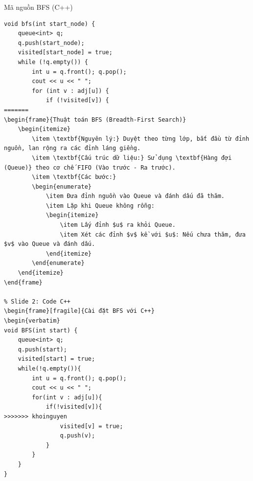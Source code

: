 \begin{frame}[fragile]{Mã nguồn BFS (C++)}
\begin{verbatim}
void bfs(int start_node) {
    queue<int> q;
    q.push(start_node);
    visited[start_node] = true;
    while (!q.empty()) {
        int u = q.front(); q.pop();
        cout << u << " ";
        for (int v : adj[u]) {
            if (!visited[v]) {
=======
\begin{frame}{Thuật toán BFS (Breadth-First Search)}
    \begin{itemize}
        \item \textbf{Nguyên lý:} Duyệt theo từng lớp, bắt đầu từ đỉnh nguồn, lan rộng ra các đỉnh láng giềng.
        \item \textbf{Cấu trúc dữ liệu:} Sử dụng \textbf{Hàng đợi (Queue)} theo cơ chế FIFO (Vào trước - Ra trước).
        \item \textbf{Các bước:}
        \begin{enumerate}
            \item Đưa đỉnh nguồn vào Queue và đánh dấu đã thăm.
            \item Lặp khi Queue không rỗng:
            \begin{itemize}
                \item Lấy đỉnh $u$ ra khỏi Queue.
                \item Xét các đỉnh $v$ kề với $u$: Nếu chưa thăm, đưa $v$ vào Queue và đánh dấu.
            \end{itemize}
        \end{enumerate}
    \end{itemize}
\end{frame}

% Slide 2: Code C++
\begin{frame}[fragile]{Cài đặt BFS với C++}
\begin{verbatim}
void BFS(int start) {
    queue<int> q;
    q.push(start);
    visited[start] = true;
    while(!q.empty()){
        int u = q.front(); q.pop();
        cout << u << " ";
        for(int v : adj[u]){
            if(!visited[v]){
>>>>>>> khoinguyen
                visited[v] = true;
                q.push(v);
            }
        }
    }
}
\end{verbatim}
\end{frame}
